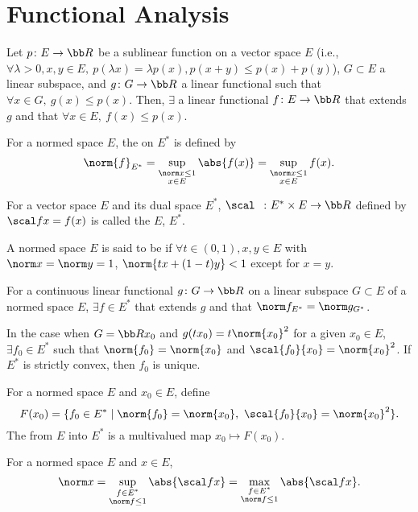 \section{Functional Analysis}\cite{brezis}
Let $p \colon E \to \bb R$ be a sublinear function on a vector space $E$ (i.e., $\forall \lambda > 0, x, y \in E,\ p(\lambda x) = \lambda p(x), p(x+y) \le p(x) + p(y)$), $G \subset E$ a linear subspace, and $g \colon G \to \bb R$ a linear functional such that $\forall x \in G,\ g(x) \le p(x)$. Then, $\exists$ a linear functional $f \colon E \to \bb R$ that extends $g$ and that $\forall x \in E,\ f(x) \le p(x)$.

For a normed space $E$, the  on $E^*$ is defined by
\[
  \norm{f}_{E^*} = \sup_{\substack{\norm x \le 1 \\ x \in E}} \abs{f(x)} = \sup_{\substack{\norm x \le 1 \\ x \in E}} f(x).
\]

For a vector space $E$ and its dual space $E^*$, $\scal\ \  \colon E^* \times E \to \bb R$ defined by $\scal fx = f(x)$ is called the  $E$, $E^*$.

A normed space $E$ is said to be  if $\forall t \in (0, 1), x, y \in E$ with $\norm x = \norm y = 1$, $\norm{tx + (1-t)y} < 1$ except for $x = y$.

For a continuous linear functional $g \colon G \to \bb R$ on a linear subspace $G \subset E$ of a normed space $E$, $\exists f \in E^*$ that extends $g$ and that $\norm f_{E^*} = \norm g_{G^*}$.

In the case when $G = \bb R x_0$ and $g(tx_0) = t \norm{x_0}^2$ for a given $x_0 \in E$, $\exists f_0 \in E^*$ such that $\norm{f_0} = \norm{x_0}$ and $\scal{f_0}{x_0} = \norm{x_0}^2$. If $E^*$ is strictly convex, then $f_0$ is unique.

For a normed space $E$ and $x_0 \in E$, define
\[
  F(x_0) = \{ f_0 \in E^* \mid \norm{f_0} = \norm{x_0},\ \scal{f_0}{x_0} = \norm{x_0}^2 \}.
\]
The  from $E$ into $E^*$ is a multivalued map $x_0 \mapsto F(x_0)$.

For a normed space $E$ and $x \in E$,
\[
  \norm x = \sup_{\substack{f \in E^* \\ \norm f \le 1}} \abs{\scal fx} = \max_{\substack{f \in E^* \\ \norm f \le 1}} \abs{\scal fx}.
\]
